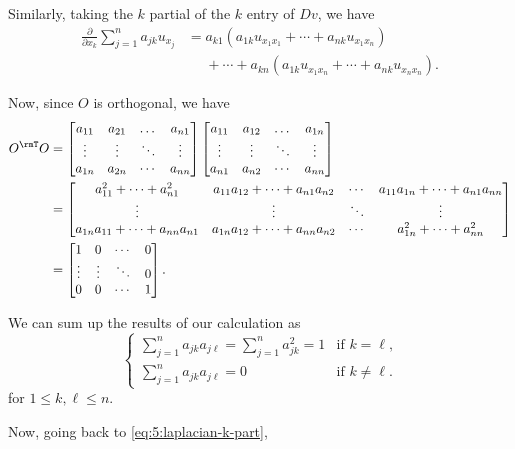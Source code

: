\begin{solution}
  Similarly, taking the \(k\) partial of the \(k\)
  entry of \(Dv\), we have
  \begin{equation}
    \label{eq:5:laplacian-k-part}
    \begin{aligned}
      \frac{\partial}{\partial x_k}\sum_{j=1}^n a_{jk}u_{x_j}
      &=a_{k1}(a_{1k}u_{x_1x_1}+\dotsb+a_{nk}u_{x_1x_n})\\
      &\phantom{{}={}}+\dotsb+a_{kn}
      (a_{1k}u_{x_1x_n}+\dotsb+a_{nk}u_{x_nx_n}).
    \end{aligned}
  \end{equation}

  Now, since \(O\) is orthogonal, we have
  \begin{align*}
    O^\rmT O
    &=%
      \begin{bmatrix}
      a_{11}&a_{21}&\dotsc&a_{n1}\\
      \vdots&\vdots&\ddots&\vdots\\
      a_{1n}&a_{2n}&\cdots&a_{nn}
      \end{bmatrix}
      \begin{bmatrix}
      a_{11}&a_{12}&\dotsc&a_{1n}\\
      \vdots&\vdots&\ddots&\vdots\\
      a_{n1}&a_{n2}&\cdots&a_{nn}
      \end{bmatrix}\\
    &=%
      \begin{bmatrix}
        a_{11}^2+\dotsb+a_{n1}^2&a_{11}a_{12}+\dotsb+a_{n1}a_{n2}
        &\cdots&a_{11}a_{1n}+\dotsb+a_{n1}a_{nn}\\
        \vdots&\vdots&\ddots&\vdots\\
        a_{1n}a_{11}+\dotsb+a_{nn}a_{n1}&a_{1n}a_{12}+\dotsb+a_{nn}a_{n2}
        &\cdots&a_{1n}^2+\dotsb+a_{nn}^2
      \end{bmatrix}\\
    &=\begin{bmatrix}
      1&0&\cdots&0\\
      \vdots&\vdots&\ddots&0\\
      0&0&\cdots&1
      \end{bmatrix}.
  \end{align*}

  We can sum up the results of our calculation as
  \begin{equation}
    \label{eq:5:ortho-matrix}
    \begin{cases}
    \sum_{j=1}^na_{jk}a_{j\ell}=\sum_{j=1}^na_{jk}^2=1&\text{if \(k=\ell\),}\\
    \sum_{j=1}^na_{jk}a_{j\ell}=0&\text{if \(k\neq\ell\).}
    \end{cases}
  \end{equation}
  for \(1\leq k,\ell\leq n\).

  Now, going back to \eqref{eq:5:laplacian-k-part},
\end{solution}
\newpage

